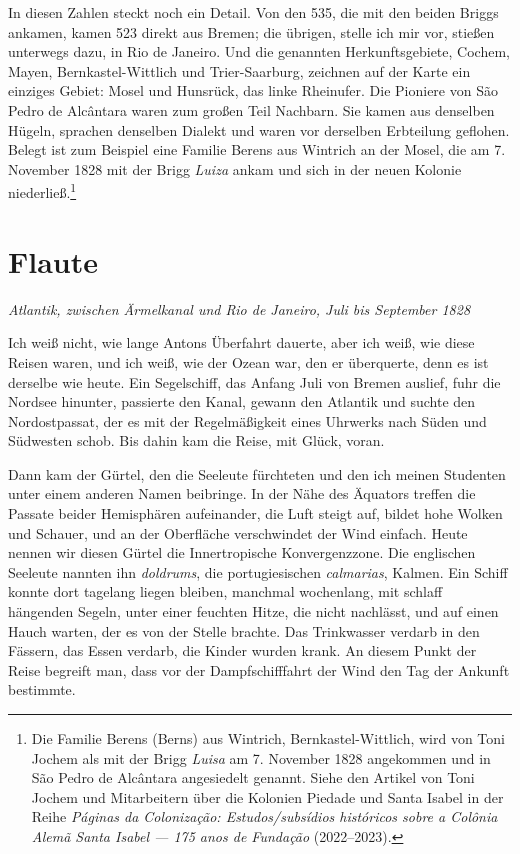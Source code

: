 \documentclass[
  ngerman,
  11pt,
  openany]{book}
\begin{document}
In diesen Zahlen steckt noch ein Detail. Von den 535, die mit den beiden
Briggs ankamen, kamen 523 direkt aus Bremen; die übrigen, stelle ich mir
vor, stießen unterwegs dazu, in Rio de Janeiro. Und die genannten
Herkunftsgebiete, Cochem, Mayen, Bernkastel-Wittlich und Trier-Saarburg,
zeichnen auf der Karte ein einziges Gebiet: Mosel und Hunsrück, das
linke Rheinufer. Die Pioniere von São Pedro de Alcântara waren zum
großen Teil Nachbarn. Sie kamen aus denselben Hügeln, sprachen denselben
Dialekt und waren vor derselben Erbteilung geflohen. Belegt ist zum
Beispiel eine Familie Berens aus Wintrich an der Mosel, die am 7.
November 1828 mit der Brigg \emph{Luiza} ankam und sich in der neuen
Kolonie niederließ.\footnote{Die Familie Berens (Berns) aus Wintrich,
  Bernkastel-Wittlich, wird von Toni Jochem als mit der Brigg
  \emph{Luisa} am 7. November 1828 angekommen und in São Pedro de
  Alcântara angesiedelt genannt. Siehe den Artikel von Toni Jochem und
  Mitarbeitern über die Kolonien Piedade und Santa Isabel in der Reihe
  \emph{Páginas da Colonização: Estudos/subsídios históricos sobre a
  Colônia Alemã Santa Isabel --- 175 anos de Fundação} (2022--2023).}

\section{Flaute}\label{flaute}

\emph{Atlantik, zwischen Ärmelkanal und Rio de Janeiro, Juli bis
September 1828}

Ich weiß nicht, wie lange Antons Überfahrt dauerte, aber ich weiß, wie
diese Reisen waren, und ich weiß, wie der Ozean war, den er überquerte,
denn es ist derselbe wie heute. Ein Segelschiff, das Anfang Juli von
Bremen auslief, fuhr die Nordsee hinunter, passierte den Kanal, gewann
den Atlantik und suchte den Nordostpassat, der es mit der Regelmäßigkeit
eines Uhrwerks nach Süden und Südwesten schob. Bis dahin kam die Reise,
mit Glück, voran.

Dann kam der Gürtel, den die Seeleute fürchteten und den ich meinen
Studenten unter einem anderen Namen beibringe. In der Nähe des Äquators
treffen die Passate beider Hemisphären aufeinander, die Luft steigt auf,
bildet hohe Wolken und Schauer, und an der Oberfläche verschwindet der
Wind einfach. Heute nennen wir diesen Gürtel die Innertropische
Konvergenzzone. Die englischen Seeleute nannten ihn \emph{doldrums}, die
portugiesischen \emph{calmarias}, Kalmen. Ein Schiff konnte dort
tagelang liegen bleiben, manchmal wochenlang, mit schlaff hängenden
Segeln, unter einer feuchten Hitze, die nicht nachlässt, und auf einen
Hauch warten, der es von der Stelle brachte. Das Trinkwasser verdarb in
den Fässern, das Essen verdarb, die Kinder wurden krank. An diesem Punkt
der Reise begreift man, dass vor der Dampfschifffahrt der Wind den Tag
der Ankunft bestimmte.
\end{document}
